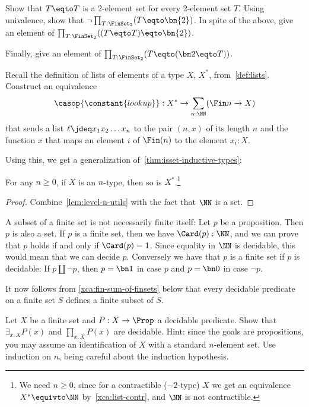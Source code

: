\begin{xca}\label{xca:2-element-sets}
Show that $T\eqto T$ is a 2-element set for every 2-element set $T$.
Using univalence, show that $\neg\prod_{T:\FinSet_2}(T\eqto\bn{2})$.
In spite of the above, give an element of
$\prod_{T:\FinSet_2}((T\eqto T)\eqto\bn{2})$.

Finally, give an element of
$\prod_{T:\FinSet_2}(T \eqto (\bn 2\eqto T))$.
\end{xca}

\begin{xca}\label{xca:tabulation}
  Recall the definition of lists of elements of a type $X$, $X^*$,
  from~\cref{def:lists}. Construct an equivalence
  \[
    \casop{\constant{lookup}} : X^*
    \to \sum_{n:\NN}(\Fin n \to X)
  \]
  that sends a list $\ell \jdeq x_1x_2\ldots x_n$ to the pair $(n, x)$
  of its length $n$ and the function $x$ that maps an element $i$ of $\Fin(n)$
  to the element $x_i : X$.
\end{xca}
Using this, we get a generalization of~\cref{thm:isset-inductive-types}:
\begin{corollary}\label{cor:lists-truncated}
  For any $n\ge 0$, if $X$ is an $n$-type, then so is $X^*$.\footnote{%
    We need $n\ge 0$, since for a contractible ($-2$-type) $X$
    we get an equivalence $X^* \equivto \NN$ by~\cref{xca:list-contr},
    and $\NN$ is not contractible.}
\end{corollary}
\begin{proof}
  Combine~\cref{lem:level-n-utils} with the fact that $\NN$
  is a set.
\end{proof}

\begin{remark}\label{rem:subset-of-fin-set}
A subset of a finite set is not necessarily finite itself:
Let $p$ be a proposition. Then $p$ is also a set.
If $p$ is a finite set, then we have 
$\Card(p) :\NN$, and we can prove that
$p$ holds if and only if $\Card(p) = 1$.
Since equality in $\NN$ is decidable, this would mean that
we can decide $p$. Conversely we have that $p$ is a finite set
if $p$ is decidable:
If $p\amalg\neg p$, then $p=\bn1$ in case $p$ and $p=\bn0$ in case $\neg p$.

It now follows from \cref{xca:fin-sum-of-finsets} below that
every decidable predicate on a finite set $S$ defines a finite subset of $S$.
\end{remark}

\begin{xca}\label{xca:dec-quant-finset}
Let $X$ be a finite set and $P: X\to\Prop$ a decidable predicate.
Show that $\exists_{x:X}P(x)$ and $\prod_{x:X}P(x)$ are decidable. 
Hint: since the goals are propositions, you may assume an
identification of $X$ with a standard $n$-element set.
Use induction on $n$, being careful about the induction hypothesis.
\end{xca}

